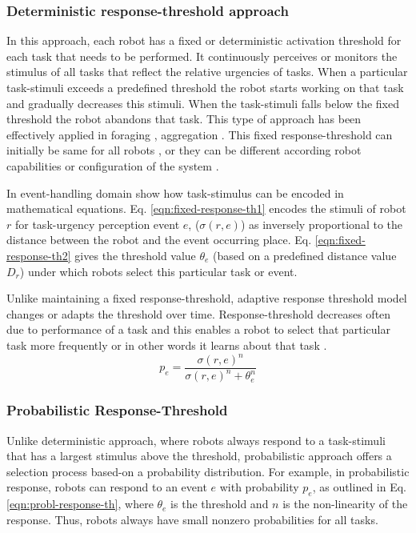 \subsubsection*{Deterministic response-threshold approach}
In this approach, each robot has a fixed or deterministic activation threshold for each task that needs to be performed. It continuously perceives or monitors the stimulus of all tasks that reflect the relative urgencies of tasks. When a particular task-stimuli exceeds a predefined  threshold the robot starts working on that task and gradually decreases this stimuli. When the task-stimuli falls below the fixed threshold the robot abandons that task. This type of approach has been effectively applied in foraging \cite{Krieger+2000,Liu+2007}, aggregation \cite{Agassounon+2002}. This fixed response-threshold can initially be same for all robots \cite{Jones+200}, or they can be different according robot capabilities or configuration of the system \cite{Krieger+2000}.

In event-handling domain  show how task-stimulus can be encoded in mathematical equations. Eq. \ref{eqn:fixed-response-th1} encodes the stimuli of robot $r$ for task-urgency perception event $e$, ($\sigma (r,e)$)  as inversely proportional to the distance between the robot and the event occurring place. Eq. \ref{eqn:fixed-response-th2} gives the threshold value $\theta_{e}$ (based on a predefined distance value $D_{r}$) under which robots select this particular task or event. 

Unlike maintaining a fixed response-threshold, adaptive response threshold model changes or adapts the threshold over time. Response-threshold decreases often due to performance of a task and this enables a robot  to select that particular task more frequently or in other words it learns about that task \cite{Bonabeau+1999,Agassounon+2002}.
\begin{equation}
\label{eqn:probl-response-th}
p_{e} = \frac{\sigma (r,e)^n}{\sigma (r,e)^n + \theta_{e}^n}
\end{equation}
\subsubsection*{Probabilistic Response-Threshold}
Unlike deterministic approach, where robots always respond to a task-stimuli that has a largest stimulus above the threshold,  probabilistic approach offers a selection process based-on a probability distribution. For example, in probabilistic response, robots can respond to an event $e$ with probability $p_{e}$, as outlined in Eq. \ref{eqn:probl-response-th}, where $\theta_{e}$ is the threshold and $n$ is the non-linearity of the response. Thus, robots  always have small nonzero probabilities  for all tasks.

